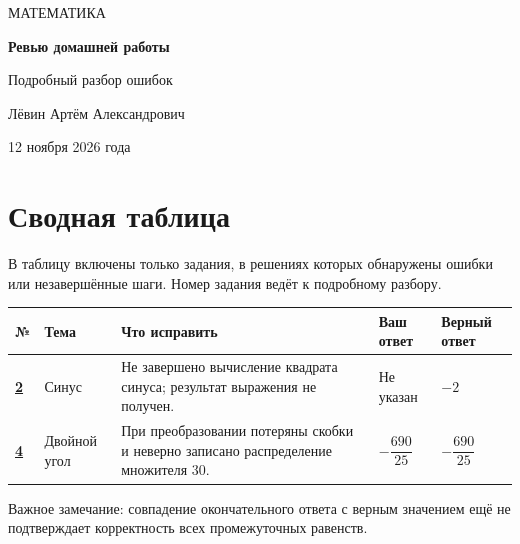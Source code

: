 \documentclass[a4paper,12pt]{article}
\begin{document}
\thispagestyle{empty}
\begin{center}
\vspace*{37mm}
{\large\color{softgray} МАТЕМАТИКА}\par
\vspace{18mm}
{\LARGE\bfseries\color{ink} Ревью домашней работы}\par
\vspace{7mm}
{\large\color{accentdark} Подробный разбор ошибок}\par
\vspace{31mm}
{\large Лёвин Артём Александрович}\par
\vspace{5mm}
{\large 12 ноября 2026 года}\par
\end{center}
\vfill
\begin{center}
\end{center}
\clearpage

\section*{Сводная таблица}
В таблицу включены только задания, в решениях которых обнаружены ошибки или незавершённые шаги. Номер задания ведёт к подробному разбору.
\par\vspace{8pt}
\renewcommand{\arraystretch}{1.4}
\small
\par\noindent\begin{tabularx}{\linewidth}{@{}p{11mm}p{24mm}X p{26mm}p{23mm}@{}}
\toprule
\textbf{№} & \textbf{Тема} & \textbf{Что исправить} & \textbf{Ваш ответ} & \textbf{Верный ответ}\\
\midrule
\hyperref[task:2]{\textbf{2}} & Синус & Не завершено вычисление квадрата синуса; результат выражения не получен. & Не указан & $-2$\\
\hyperref[task:4]{\textbf{4}} & Двойной угол & При преобразовании потеряны скобки и неверно записано распределение множителя $30$. & $-\dfrac{690}{25}$ & $-\dfrac{690}{25}$\\
\bottomrule
\end{tabularx}\par
\normalsize
\vfill
{\footnotesize\color{softgray} Важное замечание: совпадение окончательного ответа с верным значением ещё не подтверждает корректность всех промежуточных равенств.}
\clearpage
\end{document}
